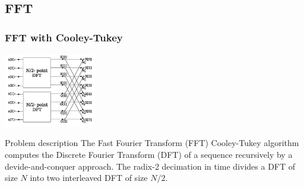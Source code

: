 \subsection{FFT}
\begin{frame}[containsverbatim]
\frametitle{FFT with Cooley-Tukey}
\begin{center}
\includegraphics[width=4.0cm]{Day2/images/fft.png}
\end{center}
\begin{block}{Problem description}
The Fast Fourier Transform (FFT) Cooley-Tukey algorithm computes the Discrete Fourier Transform (DFT) of a sequence recursively by a devide-and-conquer approach. The radix-2 decimation in time divides a DFT of size $N$ into two interleaved DFT of size $N/2$.
\end{block}
\end{frame}
